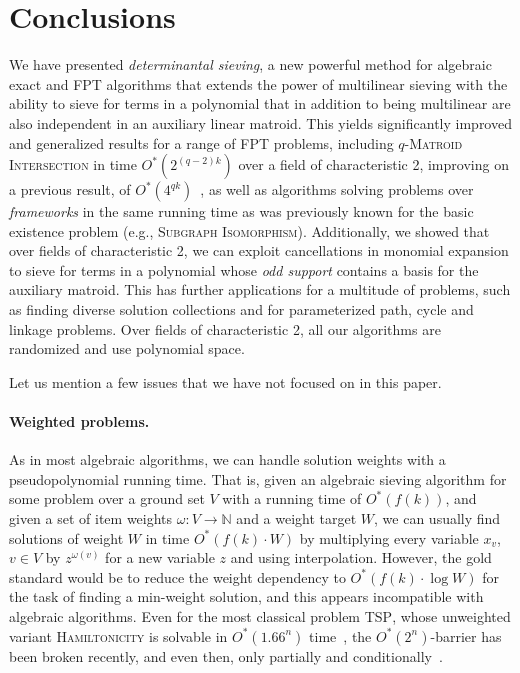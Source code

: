 \documentclass{theoretics}
\newcommand{\N}{\ensuremath{\mathbb N}\xspace}
\begin{document}
\section{Conclusions} \label{sec:conc}

We have presented \emph{determinantal sieving}, a new powerful method
for algebraic exact and FPT algorithms that
extends the power of multilinear sieving with the ability to sieve for
terms in a polynomial that in addition to being multilinear are also
independent in an auxiliary linear matroid.
This yields significantly improved and generalized results for a range
of FPT problems, including \textsc{$q$-Matroid Intersection} in time $O^*(2^{(q-2)k})$
over a field of characteristic 2, improving on a previous result, of $O^*(4^{qk})$~\cite{BrandP21},
as well as algorithms solving problems over \emph{frameworks}
in the same running time as was previously known for the basic
existence problem (e.g., \textsc{Subgraph Isomorphism}).
Additionally, we showed that over fields of characteristic 2,
we can exploit cancellations in monomial expansion to
sieve for terms in a polynomial whose \emph{odd support} contains a
basis for the auxiliary matroid. 
This has further applications for a multitude of problems,
such as finding diverse solution collections and
for parameterized path, cycle and linkage problems.
Over fields of characteristic 2, 
all our algorithms are randomized and use polynomial space. 

Let us mention a few issues that we have not focused on in this paper.

\paragraph{Weighted problems.} As in most algebraic algorithms, we can
handle solution weights with a pseudopolynomial running time. That is,
given an algebraic sieving algorithm for some problem over a ground set $V$
with a running time of $O^*(f(k))$, and given a set of item weights
$\omega \colon V \to \N$ and a weight target $W$, we can usually find
solutions of weight $W$ in time $O^*(f(k) \cdot W)$
by multiplying every variable $x_v$, $v \in V$
by $z^{\omega(v)}$ for a new variable $z$ and using interpolation.
However, the gold standard would be to reduce the weight dependency
to $O^*(f(k) \cdot \log W)$ for the task of finding a min-weight solution,
and this appears incompatible with algebraic algorithms.
Even for the most classical problem \textsc{TSP}, whose unweighted
variant \textsc{Hamiltonicity} is solvable in $O^*(1.66^n)$ time~\cite{Bjorklund14detsum},
the $O^*(2^n)$-barrier has been broken recently, and even then,
only partially and conditionally~\cite{Nederlof20TSP}.
\end{document}
